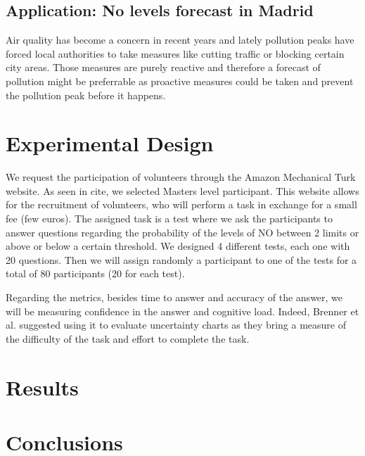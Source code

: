 \documentclass[a4paper,3p,sort&compress]{elsarticle}
\begin{document}
\subsection{Application: No levels forecast in Madrid}

Air quality has become a concern in recent years and lately pollution peaks have forced local authorities to take measures like cutting traffic or blocking certain city areas. Those measures are purely reactive and therefore a forecast of pollution might be preferrable as proactive measures could be taken and prevent the pollution peak before it happens.

\section{Experimental Design}
\label{sec:exp_design}

    We request the participation of volunteers through the Amazon Mechanical Turk website. As seen in cite, we selected Masters level participant. This website allows for the recruitment of volunteers, who will perform a task in exchange for a small fee (few euros). The assigned task is a test where we ask the participants to answer questions regarding the probability of the levels of NO between 2 limits or above or below a certain threshold. 
We designed 4 different tests, each one with 20 questions. Then we will assign randomly a participant to one of the tests for a total of 80 participants (20 for each test).

Regarding the metrics, besides time to answer and accuracy of the answer, we will be measuring confidence in the answer and cognitive load. Indeed, Brenner et al. suggested using it to evaluate uncertainty charts as they bring a measure of the difficulty of the task and effort to complete the task.

\section{Results}
\label{sec:results}

\section{Conclusions}
\label{sec:concl}


\end{document}
